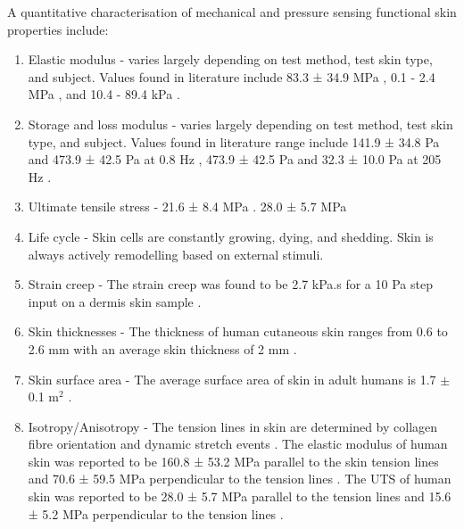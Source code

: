 A quantitative characterisation of mechanical and pressure sensing functional skin properties include:
\begin{enumerate}
    \item Elastic modulus -  varies largely depending on test method, test skin type, and subject. Values found in literature include 83.3 ± 34.9 MPa \cite{Annaidh2012}, 0.1 - 2.4 MPa \cite{Khaothong2010}, and 10.4 - 89.4 kPa \cite{Zheng1999}.
    \item Storage and loss modulus - varies largely depending on test method, test skin type, and subject. Values found in literature range include 141.9 ± 34.8 Pa and 473.9 ± 42.5 Pa at 0.8 Hz \cite{Holt2008}, 473.9 ± 42.5 Pa and 32.3 ± 10.0 Pa at 205 Hz \cite{Parvini2022}.
    \item Ultimate tensile stress - 21.6 ± 8.4 MPa \cite{Annaidh2012}. 28.0 ± 5.7 MPa \cite{Ottenio2015}
    \item Life cycle - Skin cells are constantly growing, dying, and shedding. Skin is always actively remodelling based on external stimuli.
    \item Strain creep - The strain creep was found to be 2.7 kPa.s for a 10 Pa step input on a dermis skin sample \cite{Holt2008}.
    \item Skin thicknesses - The thickness of human cutaneous skin ranges from 0.6 to 2.6 mm with an average skin thickness of 2 mm \cite{Landry2021}.
    \item Skin surface area - The average surface area of skin in adult humans is 1.7 $\pm$ 0.1 m$^2$ \cite{Landry2021}.
    \item Isotropy/Anisotropy - The tension lines in skin are determined by collagen fibre orientation and dynamic stretch events \cite{Newell2007,Paul2018}. The elastic modulus of human skin was reported to be 160.8 ± 53.2 MPa parallel to the skin tension lines and 70.6 ± 59.5 MPa perpendicular to the tension lines \cite{Ottenio2015}. The UTS of human skin was reported to be 28.0 ± 5.7 MPa parallel to the tension lines and 15.6 ± 5.2 MPa perpendicular to the tension lines \cite{Ottenio2015}.    
\end{enumerate}


